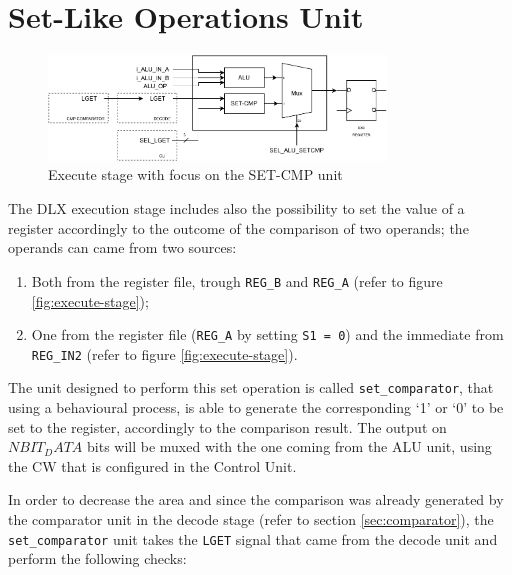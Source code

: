 \section{Set-Like Operations Unit}

\begin{figure}[ht]
	\centering
	\includegraphics[width=0.8\textwidth]{chapters/5_ExecuteStage/images/set_cmp.pdf}
	\caption{Execute stage with focus on the SET-CMP unit}
	\label{fig:set-cmp}
\end{figure}

The DLX execution stage includes also the possibility to set the value of a register accordingly to the outcome of the comparison of two operands; the operands can came from two sources:
\begin{enumerate}
	\item Both from the register file, trough \texttt{REG\_B} and \texttt{REG\_A} (refer to figure \ref{fig:execute-stage});
	\item One from the register file (\texttt{REG\_A} by setting \texttt{S1 = 0}) and the immediate from \texttt{REG\_IN2} (refer to figure \ref{fig:execute-stage}).
\end{enumerate}

The unit designed to perform this set operation is called \texttt{set\_comparator}, that using a behavioural process, is able to generate the corresponding `1' or `0' to be set to the register, accordingly to the comparison result. The output on $N BIT_DATA$ bits will be muxed with the one coming from the ALU unit, using the CW that is configured in the Control Unit.

In order to decrease the area and since the comparison was already generated by the comparator unit in the decode stage (refer to section \ref{sec:comparator}), the \texttt{set\_comparator} unit takes the \texttt{LGET} signal that came from the decode unit and perform the following checks:

